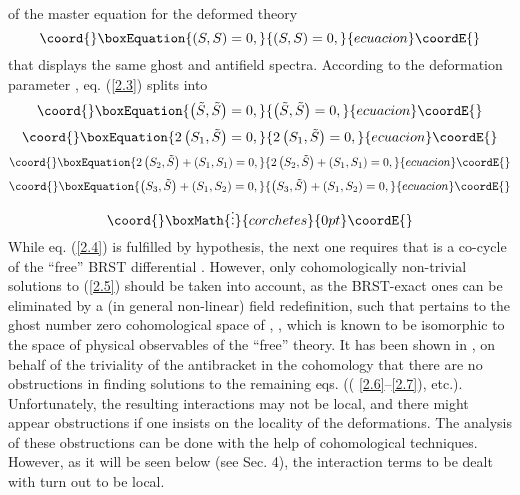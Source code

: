 \documentclass[a4paper,12pt]{article}
\begin{document}
of the master equation for the deformed theory
\begin{equation}\coord{}\boxEquation{
\left( S,S\right) =0,  \label{2.3}
}{
\left( S,S\right) =0,  }{ecuacion}\coordE{}\end{equation}
that displays the same ghost and antifield
spectra. According to the
deformation parameter \coordHE{}, eq. (\ref{2.3}) splits into
\begin{equation}\coord{}\boxEquation{
\left( \tilde{S},\tilde{S}\right) =0,  \label{2.4}
}{
\left( \tilde{S},\tilde{S}\right) =0,  }{ecuacion}\coordE{}\end{equation}
\begin{equation}\coord{}\boxEquation{
2\left( S_{1},\tilde{S}\right) =0,  \label{2.5}
}{
2\left( S_{1},\tilde{S}\right) =0,  }{ecuacion}\coordE{}\end{equation}
\begin{equation}\coord{}\boxEquation{
2\left( S_{2},\tilde{S}\right) +
\left( S_{1},S_{1}\right) =0,  \label{2.6}
}{
2\left( S_{2},\tilde{S}\right) +
\left( S_{1},S_{1}\right) =0,  }{ecuacion}\coordE{}\end{equation}
\begin{equation}\coord{}\boxEquation{
\left( S_{3},\tilde{S}\right) +
\left( S_{1},S_{2}\right) =0,  \label{2.7}
}{
\left( S_{3},\tilde{S}\right) +
\left( S_{1},S_{2}\right) =0,  }{ecuacion}\coordE{}\end{equation}
\[\coord{}\boxMath{
\vdots
}{corchetes}{0pt}\coordE{}\]
While eq. (\ref{2.4}) is fulfilled by
hypothesis, the next one requires that
\coordHE{} is a co-cycle of the ``free''
BRST differential \coordHE{}. However,
only cohomologically non-trivial
solutions to (\ref{2.5}) should be
taken into account, as the BRST-exact
ones can be eliminated by a (in general non-linear)
field redefinition, such
that \coordHE{} pertains to the ghost number
zero cohomological space of \coordHE{}, \coordHE{}, which is known to be
isomorphic to the space of
physical observables of the ``free'' theory.
It has been shown in \cite{3},
\cite{20} on behalf of the triviality of the
antibracket in the cohomology
that there are no obstructions in finding
solutions to the remaining eqs. ((%
\ref{2.6}--\ref{2.7}), etc.). Unfortunately,
the resulting interactions may
not be local, and there might appear
obstructions if one insists on the
locality of the deformations. The analysis
of these obstructions can be done
with the help of cohomological techniques.
However, as it will be seen below
(see Sec. 4), the interaction terms to be
dealt with turn out to be local.
\end{document}
